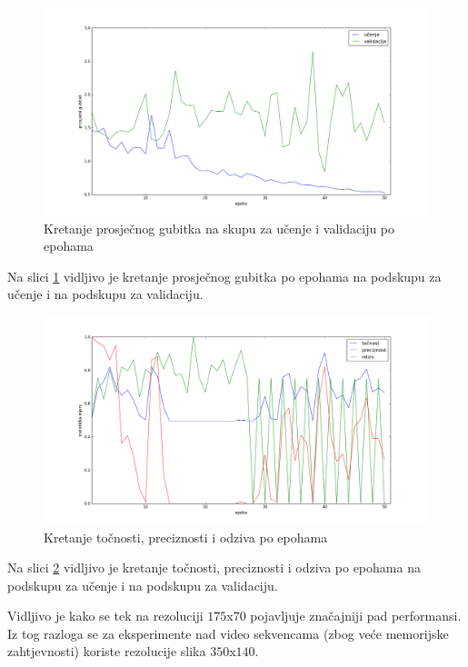\documentclass[times, utf8, diplomski, numeric]{fer}
\begin{document}
\begin{figure}[H]
\centering
\includegraphics[scale=0.35]{images/single_hand_scale025_loss.png}
\caption{Kretanje prosječnog gubitka na skupu za učenje i validaciju po epohama}
\label{img:single_hand_scale025_loss}
\end{figure}
\noindent Na slici \ref{img:single_hand_scale025_loss} vidljivo je kretanje prosječnog gubitka po epohama na podskupu za učenje i na podskupu za validaciju.

\begin{figure}[H]
\centering
\includegraphics[scale=0.35]{images/single_hand_scale025_acc_ap.png}
\caption{Kretanje točnosti, preciznosti i odziva po epohama}
\label{img:single_hand_scale025_acc_ap}
\end{figure}
\noindent Na slici \ref{img:single_hand_scale025_acc_ap} vidljivo je kretanje točnosti, preciznosti i odziva po epohama na podskupu za učenje i na podskupu za validaciju.

Vidljivo je kako se tek na rezoluciji $175$x$70$ pojavljuje značajniji pad performansi. 
Iz tog razloga se za eksperimente nad video sekvencama (zbog veće memorijske zahtjevnosti) koriste rezolucije slika $350$x$140$.
\end{document}

